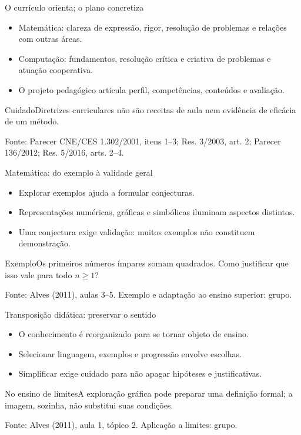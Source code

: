 \documentclass[aspectratio=169,11pt]{beamer}
\newcommand{\fonte}[1]{\par\vfill{\tiny\color{gray}Fonte: #1}}
\begin{document}
\begin{frame}{O currículo orienta; o plano concretiza}
\begin{itemize}\item Matemática: clareza de expressão, rigor, resolução de problemas e relações com outras áreas.\item Computação: fundamentos, resolução crítica e criativa de problemas e atuação cooperativa.\item O projeto pedagógico articula perfil, competências, conteúdos e avaliação.\end{itemize}\begin{alertblock}{Cuidado}Diretrizes curriculares não são receitas de aula nem evidência de eficácia de um método.\end{alertblock}
\fonte{Parecer CNE/CES 1.302/2001, itens 1--3; Res. 3/2003, art. 2; Parecer 136/2012; Res. 5/2016, arts. 2--4.}
\end{frame}
\begin{frame}{Matemática: do exemplo à validade geral}
\begin{itemize}\item Explorar exemplos ajuda a formular conjecturas.\item Representações numéricas, gráficas e simbólicas iluminam aspectos distintos.\item Uma conjectura exige validação: muitos exemplos não constituem demonstração.\end{itemize}\begin{block}{Exemplo}Os primeiros números ímpares somam quadrados. Como justificar que isso vale para todo $n\geq1$?\end{block}
\fonte{Alves (2011), aulas 3--5. Exemplo e adaptação ao ensino superior: grupo.}
\end{frame}
\begin{frame}{Transposição didática: preservar o sentido}
\begin{itemize}\item O conhecimento é reorganizado para se tornar objeto de ensino.\item Selecionar linguagem, exemplos e progressão envolve escolhas.\item Simplificar exige cuidado para não apagar hipóteses e justificativas.\end{itemize}\begin{exampleblock}{No ensino de limites}A exploração gráfica pode preparar uma definição formal; a imagem, sozinha, não substitui suas condições.\end{exampleblock}
\fonte{Alves (2011), aula 1, tópico 2. Aplicação a limites: grupo.}
\end{frame}
\end{document}
